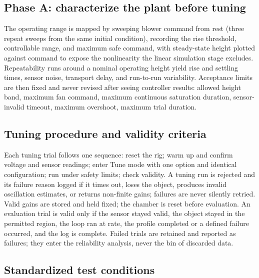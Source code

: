 \documentclass[10pt,twocolumn]{article}
\begin{document}
\subsection{Phase A: characterize the plant before tuning}

The operating range is mapped by sweeping blower command from rest (three repeat sweeps from the same initial condition), recording the rise threshold, controllable range, and maximum safe command, with steady-state height plotted against command to expose the nonlinearity the linear simulation stage excludes. Repeatability runs around a nominal operating height yield rise and settling times, sensor noise, transport delay, and run-to-run variability. Acceptance limits are then fixed and never revised after seeing controller results: allowed height band, maximum fan command, maximum continuous saturation duration, sensor-invalid timeout, maximum overshoot, maximum trial duration.

\subsection{Tuning procedure and validity criteria}

Each tuning trial follows one sequence: reset the rig; warm up and confirm voltage and sensor readings; enter Tune mode with one option and identical configuration; run under safety limits; check validity. A tuning run is rejected and its failure reason logged if it times out, loses the object, produces invalid oscillation estimates, or returns non-finite gains; failures are never silently retried. Valid gains are stored and held fixed; the chamber is reset before evaluation. An evaluation trial is valid only if the sensor stayed valid, the object stayed in the permitted region, the loop ran at rate, the profile completed or a defined failure occurred, and the log is complete. Failed trials are retained and reported as failures; they enter the reliability analysis, never the bin of discarded data.

\subsection{Standardized test conditions}
\end{document}

